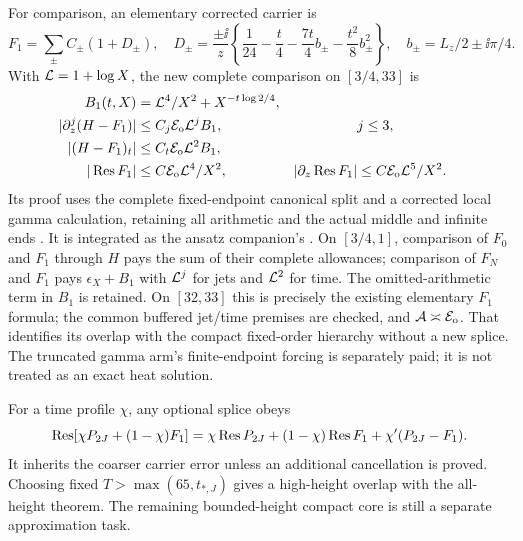 For comparison, an elementary corrected carrier is
\begin{equation}
 F_1=\sum_\pm C_\pm(1+D_\pm),\quad
 D_\pm=\frac{\pm\ii}{z}
  \left\{\frac1{24}-\frac t4-\frac{7t}4b_\pm-\frac{t^2}8b_\pm^2\right\},
 \quad b_\pm=L_z/2\pm\ii\pi/4.
 \label{eq:elementary-correction}
\end{equation}
With $\mathcal L=1+\log X$, the new complete comparison on $[3/4,33]$
is
\begin{align}
 B_1(t,X)&=\mathcal L^4/X^2+X^{-t\log2/4},\notag\\
 |\partial_z^j(H-F_1)|&\le C_j\mathcal E_{\mathrm o}\mathcal L^jB_1,&&j\le3,\notag\\
 |(H-F_1)_t|&\le C_t\mathcal E_{\mathrm o}\mathcal L^2B_1,\label{eq:intermediate-band}\\
 |\operatorname{Res} F_1|&\le C\mathcal E_{\mathrm o}\mathcal L^4/X^2,
 &|\partial_z\operatorname{Res} F_1|&\le C\mathcal E_{\mathrm o}\mathcal L^5/X^2.\notag
\end{align}
Its proof uses the complete fixed-endpoint canonical split and a
corrected local gamma calculation, retaining all arithmetic and the
actual middle and infinite ends \cite{intermediate}. It is integrated
as the ansatz companion's
.
On $[3/4,1]$, comparison of $F_0$ and $F_1$ through $H$ pays the sum
of their complete allowances; comparison of $F_N$ and $F_1$ pays
$\epsilon_X+B_1$ with $\mathcal L^j$ for jets and $\mathcal L^2$ for time.
The omitted-arithmetic term in $B_1$ is retained. On $[32,33]$ this
is precisely the existing elementary $F_1$ formula; the common buffered
jet/time premises are checked, and $\mathcal A\asymp\mathcal E_{\mathrm o}$. That identifies
its overlap with the compact fixed-order hierarchy without a new splice.
The truncated gamma arm's finite-endpoint forcing is separately paid;
it is not treated as an exact heat solution.

For a time profile $\chi$, any optional splice obeys
\begin{equation}
 \operatorname{Res}[\chi P_{2J}+(1-\chi)F_1]
 =\chi\operatorname{Res} P_{2J}+(1-\chi)\operatorname{Res} F_1+\chi'(P_{2J}-F_1).
 \label{eq:positive-splice}
\end{equation}
It inherits the coarser carrier error unless an additional cancellation
is proved. Choosing fixed $T>\max(65,t_{*,J})$ gives a high-height
overlap with the all-height theorem. The remaining bounded-height
compact core is still a separate approximation task.
